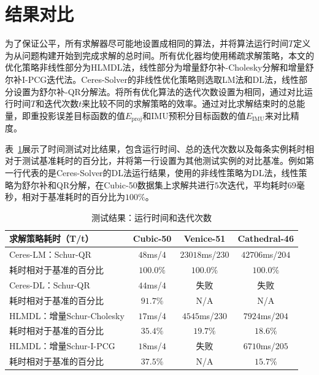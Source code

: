 \section{结果对比}

为了保证公平，所有求解器尽可能地设置成相同的算法，并将算法运行时间$T$定义为从问题构建开始到完成求解的总时间。所有优化器均使用稀疏求解策略，本文的优化策略非线性部分为HLMDL法，线性部分为增量舒尔补-Cholesky分解和增量舒尔补I-PCG迭代法。Ceres-Solver的非线性优化策略则选取LM法和DL法，线性部分设置为舒尔补-QR分解法。将所有优化算法的迭代次数设置为相同，通过对比运行时间$T$和迭代次数$t$来比较不同的求解策略的效率。通过对比求解结束时的总能量，即重投影误差目标函数的值$E_{\text{proj}}$和IMU预积分目标函数的值$E_{\text{IMU}}$来对比精度。

表~\ref{tab:time}展示了时间测试对比结果，包含运行时间、总的迭代次数以及每条实例耗时相对于测试基准耗时的百分比，并将第一行设置为其他测试实例的对比基准。例如第一行代表的是Ceres-Solver的DL法运行结果，使用的非线性策略为DL法，线性策略为舒尔补和QR分解，在Cubic-50数据集上求解共进行$5$次迭代，平均耗时$69$毫秒，相对于基准耗时的百分比为$100\%$。

{
\linespread{1}
\begin{table}[htb!]
\caption{测试结果：运行时间和迭代次数}
\label{tab:time}
\centering
\begin{tabular}[b]{l|ccc}
    \toprule
    求解策略耗时（T/t）       &   Cubic-50 &       Venice-51 &    Cathedral-46 \\ \midrule
    Ceres-LM：Schur-QR        & $48$ms/$4$ & $23018$ms/$230$ & $42706$ms/$204$ \\
    耗时相对于基准的百分比    &  $100.0\%$ &       $100.0\%$ &       $100.0\%$ \\ \midrule
    Ceres-DL：Schur-QR        & $44$ms/$4$ &            失败 &            失败 \\
    耗时相对于基准的百分比    &   $91.7\%$ &             N/A &             N/A \\ \midrule
    HLMDL：增量Schur-Cholesky & $17$ms/$4$ &  $4545$ms/$230$ &  $7924$ms/$204$ \\
    耗时相对于基准的百分比    &   $35.4\%$ &        $19.7\%$ &        $18.6\%$ \\ \midrule
    HLMDL：增量Schur-I-PCG    & $18$ms/$4$ &            失败 &  $6710$ms/$205$ \\
    耗时相对于基准的百分比    &   $37.5\%$ &             N/A &        $15.7\%$ \\
    \bottomrule
\end{tabular}
\end{table}
}

